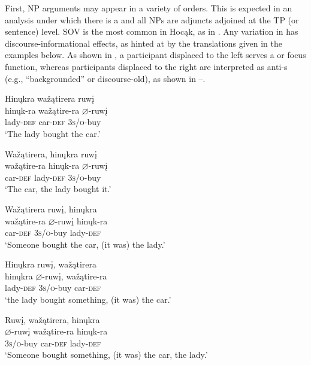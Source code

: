 \documentclass[output=paper]{LSP/langsci}
\begin{document}
First, NP arguments may appear in a variety of orders.  This is expected in an analysis under which there is a  and all NPs are adjuncts adjoined at the TP (or sentence) level. SOV  is the most common in Hocąk, as in . Any variation in  has discourse-informational effects, as hinted at by the  translations given in the examples below. As shown in , a participant displaced to the left serves a  or focus function, whereas participants displaced to the right are interpreted as anti-s (e.g., ``backgrounded'' or discourse-old), as shown in --.
 

\ea
\label{ex:jrs:11} 
\glll Hin\k{u}kra wa\v{z}ątirera ruw\k{i}  \\
hin\k{u}k-ra	wa\v{z}ątire-ra 	$\varnothing$-ruw\k{i} \\
lady-\textsc{def}	car-\textsc{def}	 \textsc{3s/o}-buy \\
\trans `The lady bought the car.'
\z

\ea\label{ex:jrs:12}
\ea\label{ex:jrs:12a}
\glll Wa\v{z}ątirera,	hin\k{u}kra		ruw\k{i} \\
wa\v{z}ątire-ra 	hin\k{u}k-ra		$\varnothing$-ruw\k{i} \\
car-\textsc{def}			lady-\textsc{def}		\textsc{3s/o}-buy \\
\trans `The car, the lady bought it.' 

\ex\label{ex:jrs:12b}
\glll Wa\v{z}ątirera		ruw\k{i},			hin\k{u}kra\\
wa\v{z}ątire-ra	$\varnothing$-ruw\k{i}	hin\k{u}k-ra \\
car-\textsc{def} 			\textsc{3s/o}-buy 	lady-\textsc{def} \\
\trans `Someone bought the car, (it was) the lady.' 

\ex\label{ex:jrs:12c}
\glll Hin\k{u}kra 		ruw\k{i}, 		wa\v{z}ątirera \\
hin\k{u}kra 	$\varnothing$-ruw\k{i}, 		wa\v{z}ątire-ra \\
lady-\textsc{def} \textsc{3s/o}-buy car-\textsc{def} \\
\trans `the lady bought something, (it was) the car.' 

\ex\label{ex:jrs:12d}
\glll Ruw\k{i}, 		wa\v{z}ątirera,	hin\k{u}kra\\
$\varnothing$-ruw\k{i}	wa\v{z}ątire-ra	hin\k{u}k-ra \\
\textsc{3s/o}-buy car-\textsc{def} lady-\textsc{def} \\
\trans `Someone bought something, (it was) the car, the lady.' 
\end{document}
